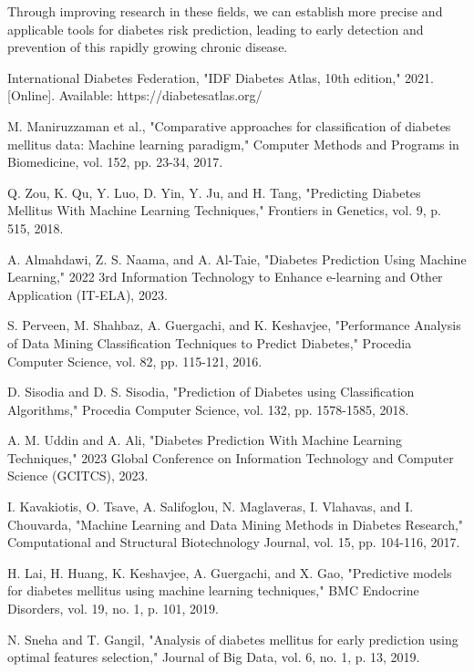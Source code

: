 \documentclass[conference]{IEEEtran}
\begin{document}
Through improving research in these fields, we can establish more precise and applicable tools for diabetes risk prediction, leading to early detection and prevention of this rapidly growing chronic disease.

\begin{thebibliography}{00}
 International Diabetes Federation, "IDF Diabetes Atlas, 10th edition," 2021. [Online]. Available: https://diabetesatlas.org/

 M. Maniruzzaman et al., "Comparative approaches for classification of diabetes mellitus data: Machine learning paradigm," Computer Methods and Programs in Biomedicine, vol. 152, pp. 23-34, 2017.

 Q. Zou, K. Qu, Y. Luo, D. Yin, Y. Ju, and H. Tang, "Predicting Diabetes Mellitus With Machine Learning Techniques," Frontiers in Genetics, vol. 9, p. 515, 2018.

 A. Almahdawi, Z. S. Naama, and A. Al-Taie, "Diabetes Prediction Using Machine Learning," 2022 3rd Information Technology to Enhance e-learning and Other Application (IT-ELA), 2023.

 S. Perveen, M. Shahbaz, A. Guergachi, and K. Keshavjee, "Performance Analysis of Data Mining Classification Techniques to Predict Diabetes," Procedia Computer Science, vol. 82, pp. 115-121, 2016.

 D. Sisodia and D. S. Sisodia, "Prediction of Diabetes using Classification Algorithms," Procedia Computer Science, vol. 132, pp. 1578-1585, 2018.

 A. M. Uddin and A. Ali, "Diabetes Prediction With Machine Learning Techniques," 2023 Global Conference on Information Technology and Computer Science (GCITCS), 2023.

 I. Kavakiotis, O. Tsave, A. Salifoglou, N. Maglaveras, I. Vlahavas, and I. Chouvarda, "Machine Learning and Data Mining Methods in Diabetes Research," Computational and Structural Biotechnology Journal, vol. 15, pp. 104-116, 2017.

 H. Lai, H. Huang, K. Keshavjee, A. Guergachi, and X. Gao, "Predictive models for diabetes mellitus using machine learning techniques," BMC Endocrine Disorders, vol. 19, no. 1, p. 101, 2019.

 N. Sneha and T. Gangil, "Analysis of diabetes mellitus for early prediction using optimal features selection," Journal of Big Data, vol. 6, no. 1, p. 13, 2019.


\end{thebibliography}
\end{document}

